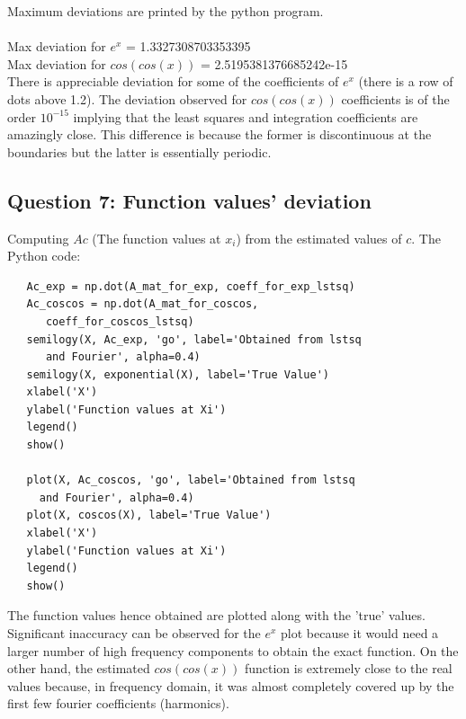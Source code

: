 \documentclass[11pt, a4paper]{article}
\begin{document}
   Maximum deviations are printed by the python program.\\\\
   Max deviation for $e^x$ = 1.3327308703353395\\
   Max deviation for $cos(cos(x))$ = 2.5195381376685242e-15\\
   
   There is appreciable deviation for some of the coefficients of $e^x$ (there is a row of dots above 1.2). 
   The deviation observed for $cos(cos(x))$ coefficients is of the order $10^{-15}$ implying that the least squares and integration coefficients are amazingly close. This difference is because the former is discontinuous at the boundaries but the latter is essentially periodic. 
   
   \subsection{Question 7: Function values' deviation}
   Computing $Ac$ (The function values at $x_{i}$) from the estimated values of $c$. The Python code:
   \begin{verbatim}
   Ac_exp = np.dot(A_mat_for_exp, coeff_for_exp_lstsq)
   Ac_coscos = np.dot(A_mat_for_coscos, 
      coeff_for_coscos_lstsq)
   semilogy(X, Ac_exp, 'go', label='Obtained from lstsq 
      and Fourier', alpha=0.4)
   semilogy(X, exponential(X), label='True Value')
   xlabel('X')
   ylabel('Function values at Xi')
   legend()
   show()

   plot(X, Ac_coscos, 'go', label='Obtained from lstsq 
     and Fourier', alpha=0.4)
   plot(X, coscos(X), label='True Value')
   xlabel('X')
   ylabel('Function values at Xi')
   legend()
   show()
   \end{verbatim}
   
   The function values hence obtained are plotted along with the 'true' values. Significant inaccuracy can be observed for the $e^x$ plot because it would need a larger number of high frequency components to obtain the exact function. On the other hand, the estimated $cos(cos(x))$ function is extremely close to the real values because, in frequency domain, it was almost completely covered up by the first few fourier coefficients (harmonics).
    
\end{document}
